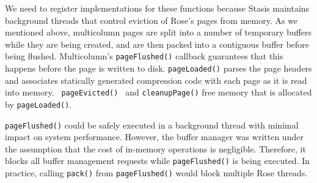 \documentclass{vldb}
\newcommand{\rows}{Rose\xspace}
\newcommand{\rowss}{Rose's\xspace}
\begin{document}



We need to register implementations for these functions because
Stasis maintains background threads that control eviction
of \rowss pages from memory.  As we mentioned above, multicolumn pages
are split into a number of temporary buffers while they are being
created, and are then packed into a contiguous buffer before being
flushed.  Multicolumn's {\tt pageFlushed()} callback guarantees that
this happens before the page is written to disk.  {\tt pageLoaded()}
parses the page headers and associates statically generated
compression code with each page as it is read into memory.  {\tt
  pageEvicted() } and {\tt cleanupPage()} free memory that is
allocated by {\tt pageLoaded()}.



{\tt pageFlushed()} could be safely executed in a background thread
with minimal impact on system performance.  However, the buffer
manager was written under the assumption that the cost of in-memory
operations is negligible.  Therefore, it blocks all buffer management
requests while {\tt pageFlushed()} is being executed.  In practice,
calling {\tt pack()} from {\tt pageFlushed()} would block multiple
\rows threads.
\end{document}
